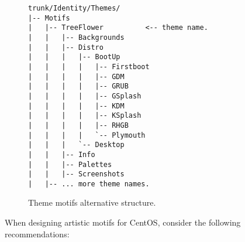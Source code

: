 \begin{figure}[!hbp]
\hrulefill
\begin{verbatim}
trunk/Identity/Themes/
|-- Motifs
|   |-- TreeFlower          <-- theme name.
|   |   |-- Backgrounds
|   |   |-- Distro
|   |   |   |-- BootUp
|   |   |   |   |-- Firstboot
|   |   |   |   |-- GDM
|   |   |   |   |-- GRUB
|   |   |   |   |-- GSplash
|   |   |   |   |-- KDM
|   |   |   |   |-- KSplash  
|   |   |   |   |-- RHGB
|   |   |   |   `-- Plymouth
|   |   |   `-- Desktop
|   |   |-- Info
|   |   |-- Palettes
|   |   |-- Screenshots
|   |-- ... more theme names.
\end{verbatim}
\hrulefill
\caption{Theme motifs alternative structure.%
   \label{fig:Concepts:Identity:Themes:Motifs:Alternative}}
\end{figure}

When designing artistic motifs for CentOS, consider the following
recommendations:


